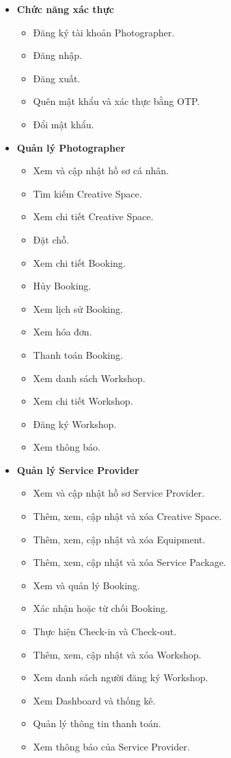 \begin{itemize}
	\item \textbf{Chức năng xác thực}
	\begin{itemize}
		\item Đăng ký tài khoản Photographer.
		\item Đăng nhập.
		\item Đăng xuất.
		\item Quên mật khẩu và xác thực bằng OTP.
		\item Đổi mật khẩu.
	\end{itemize}
	
	\item \textbf{Quản lý Photographer}
	\begin{itemize}
		\item Xem và cập nhật hồ sơ cá nhân.
		\item Tìm kiếm Creative Space.
		\item Xem chi tiết Creative Space.
		\item Đặt chỗ.
		\item Xem chi tiết Booking.
		\item Hủy Booking.
		\item Xem lịch sử Booking.
		\item Xem hóa đơn.
		\item Thanh toán Booking.
		\item Xem danh sách Workshop.
		\item Xem chi tiết Workshop.
		\item Đăng ký Workshop.
		\item Xem thông báo.
	\end{itemize}
	
	\item \textbf{Quản lý Service Provider}
	\begin{itemize}
		\item Xem và cập nhật hồ sơ Service Provider.
		\item Thêm, xem, cập nhật và xóa Creative Space.
		\item Thêm, xem, cập nhật và xóa Equipment.
		\item Thêm, xem, cập nhật và xóa Service Package.
		\item Xem và quản lý Booking.
		\item Xác nhận hoặc từ chối Booking.
		\item Thực hiện Check-in và Check-out.
		\item Thêm, xem, cập nhật và xóa Workshop.
		\item Xem danh sách người đăng ký Workshop.
		\item Xem Dashboard và thống kê.
		\item Quản lý thông tin thanh toán.
		\item Xem thông báo của Service Provider.
	\end{itemize}
	

\end{itemize}
